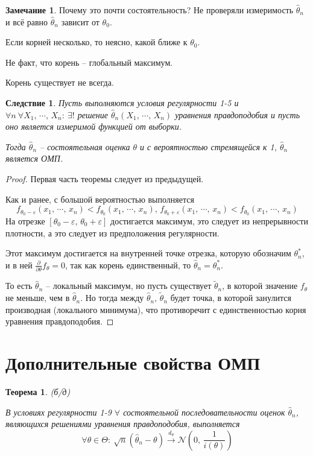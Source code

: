 \documentclass[a4paper,12pt]{article}
\theoremstyle{plain}
\newtheorem{theorem}{Теорема}[section]
\newtheorem*{corollary}{Следствие}
\theoremstyle{definition}
\newtheorem*{note}{Замечание}
\theoremstyle{remark}
\begin{document}
\begin{note}
  Почему это почти состоятельность? Не проверяли измеримость $\hat{\theta}_n$ и всё равно $\hat{\theta}_n$ зависит от $\theta_0$.

  Если корней несколько, то неясно, какой ближе к $\theta_0$.

  Не факт, что корень -- глобальный максимум.

  Корень существует не всегда.
\end{note}

\begin{corollary}
  Пусть выполняются условия регулярности 1-5 и $\forall n \: \forall X_1,\,\cdots,\,X_n :\: \exists!$ решение $\hat{\theta}_n(X_1,\,\cdots,\,X_n)$ уравнения правдоподобия и пусть оно является измеримой функцией от выборки.

  Тогда $\hat{\theta}_n$ -- состоятельная оценка $\theta$ и с вероятностью стремящейся к 1, $\hat{\theta}_n$ является ОМП.
\end{corollary}

\begin{proof}
  Первая часть теоремы следует из предыдущей.

  Как и ранее, с большой вероятностью выполняется
  \[
    f_{\theta_0 - \varepsilon}(x_1,\,\cdots,\,x_n) < f_{\theta_0}(x_1,\,\cdots,\,x_n),\, f_{\theta_0 + \varepsilon}(x_1,\,\cdots,\,x_n) < f_{\theta_0}(x_1,\,\cdots,\,x_n)
  \]
  На отрезке $[\theta_0 - \varepsilon,\, \theta_0 + \varepsilon]$ достигается максимум, это следует из непрерывности плотности, а это следует из предположения регулярности.

  Этот максимум достигается на внутренней точке отрезка, которую обозначим $\theta_n^*$, и в ней $\frac{\partial}{\partial\theta}f_\theta = 0$, так как корень единственный, то $\hat{\theta}_n = \theta^*_n$.

  То есть $\hat{\theta}_n$ -- локальный максимум, но пусть существует $\tilde{\theta}_n$, в которой значение $f_\theta$ не меньше, чем в $\hat{\theta}_n$. Но тогда между $\hat{\theta}_n,\, \tilde{\theta}_n$ будет точка, в которой занулится производная (локального минимума), что противоречит с единственностью корня уравнения правдоподобия.
\end{proof}

\section{Дополнительные свойства ОМП}
\begin{theorem}
  (б/д)

  В условиях регулярности 1-9 $\forall$ состоятельной последовательности оценок $\hat{\theta}_n$, являющихся решениями уравнения правдоподобия, выполняется
  \[
    \forall \theta \in \Theta :\: \sqrt{n}(\hat{\theta}_n - \theta) \overset{d_\theta}{\to} \mathcal{N}\left(0,\, \frac{1}{i(\theta)}\right)
  \]
\end{theorem}
\end{document}
